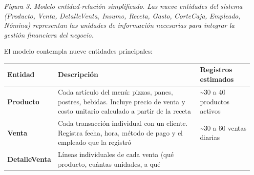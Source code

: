 \documentclass[
  12pt,
  spanish,
]{article}
\begin{document}
\emph{Figura 3. Modelo entidad-relación simplificado. Las nueve
entidades del sistema (Producto, Venta, DetalleVenta, Insumo, Receta,
Gasto, CorteCaja, Empleado, Nómina) representan las unidades de
información necesarias para integrar la gestión financiera del negocio.}

El modelo contempla nueve entidades principales:

\begin{longtable}[]{@{}lll@{}}
\toprule
\begin{minipage}[b]{0.30\columnwidth}\raggedright
Entidad\strut
\end{minipage} & \begin{minipage}[b]{0.30\columnwidth}\raggedright
Descripción\strut
\end{minipage} & \begin{minipage}[b]{0.30\columnwidth}\raggedright
Registros estimados\strut
\end{minipage}\tabularnewline
\midrule
\endhead
\begin{minipage}[t]{0.30\columnwidth}\raggedright
\textbf{Producto}\strut
\end{minipage} & \begin{minipage}[t]{0.30\columnwidth}\raggedright
Cada artículo del menú: pizzas, panes, postres, bebidas. Incluye precio
de venta y costo unitario calculado a partir de la receta\strut
\end{minipage} & \begin{minipage}[t]{0.30\columnwidth}\raggedright
\textasciitilde30 a 40 productos activos\strut
\end{minipage}\tabularnewline
\begin{minipage}[t]{0.30\columnwidth}\raggedright
\textbf{Venta}\strut
\end{minipage} & \begin{minipage}[t]{0.30\columnwidth}\raggedright
Cada transacción individual con un cliente. Registra fecha, hora, método
de pago y el empleado que la registró\strut
\end{minipage} & \begin{minipage}[t]{0.30\columnwidth}\raggedright
\textasciitilde30 a 60 ventas diarias\strut
\end{minipage}\tabularnewline
\begin{minipage}[t]{0.30\columnwidth}\raggedright
\textbf{DetalleVenta}\strut
\end{minipage} & \begin{minipage}[t]{0.30\columnwidth}\raggedright
Líneas individuales de cada venta (qué producto, cuántas unidades, a qué

\end{minipage}
\end{longtable}
\end{document}
